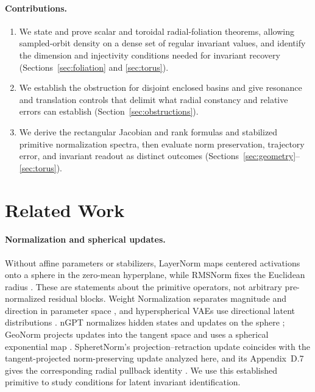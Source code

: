 \documentclass[10pt]{article}
\theoremstyle{definition}
\theoremstyle{remark}
\begin{document}
\paragraph{Contributions.}
\begin{enumerate}
    \item We state and prove scalar and toroidal radial-foliation theorems, allowing sampled-orbit density on a dense set of regular invariant values, and identify the dimension and injectivity conditions needed for invariant recovery (Sections~\ref{sec:foliation} and \ref{sec:torus}).
    \item We establish the obstruction for disjoint enclosed basins and give resonance and translation controls that delimit what radial constancy and relative errors can establish (Section~\ref{sec:obstructions}).
    \item We derive the rectangular Jacobian and rank formulas and stabilized primitive normalization spectra, then evaluate norm preservation, trajectory error, and invariant readout as distinct outcomes (Sections~\ref{sec:geometry}--\ref{sec:torus}).
\end{enumerate}

\section{Related Work}
\label{sec:related}

\paragraph{Normalization and spherical updates.}
Without affine parameters or stabilizers, LayerNorm maps centered activations onto a sphere in the zero-mean hyperplane, while RMSNorm fixes the Euclidean radius \citep{ba2016layer, zhang2019root}. These are statements about the primitive operators, not arbitrary pre-normalized residual blocks. Weight Normalization separates magnitude and direction in parameter space \citep{salimans2016weight}, and hyperspherical VAEs use directional latent distributions \citep{davidson2018hyperspherical, xu2018spherical}. nGPT normalizes hidden states and updates on the sphere \citep{loshchilov2024ngpt}; GeoNorm projects updates into the tangent space and uses a spherical exponential map \citep{zheng2026geonorm}. SpheretNorm's projection--retraction update coincides with the tangent-projected norm-preserving update analyzed here, and its Appendix~D.7 gives the corresponding radial pullback identity \citep{zhang2026spheretnorm}. We use this established primitive to study conditions for latent invariant identification.
\end{document}
